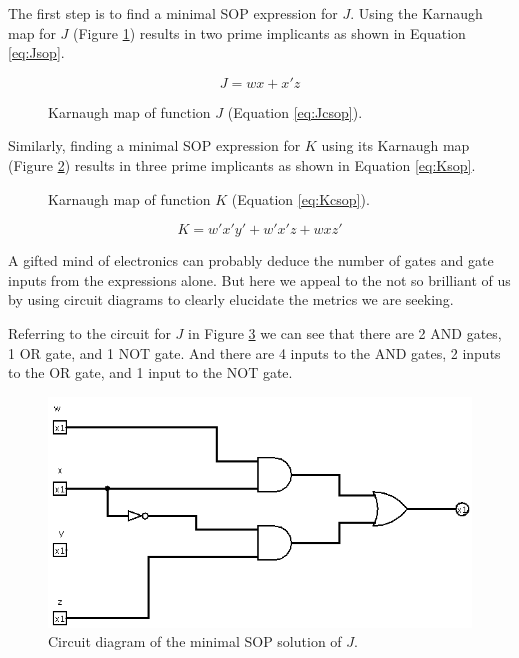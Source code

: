 \documentclass[12pt]{article}
\begin{document}
\begin{samepage}
The first step is to find a minimal SOP expression for $J$.
Using the Karnaugh map for $J$ (Figure \ref{fig:Jmap})
results in two prime implicants as shown in Equation \ref{eq:Jsop}.

\begin{equation}
	J = w x + x' z  \label{eq:Jsop}
\end{equation}
\end{samepage}

\begin{figure}[!hbt]
\begin{center}
\end{center}
\caption{Karnaugh map of function $J$ (Equation \ref{eq:Jcsop}).}
\label{fig:Jmap}
\end{figure}

Similarly, finding a minimal SOP expression for $K$ using its
Karnaugh map (Figure \ref{fig:Kmap}) results in three prime implicants
as shown in Equation \ref{eq:Ksop}.

\begin{figure}[!hbt]
\begin{center}
\end{center}
\caption{Karnaugh map of function $K$ (Equation \ref{eq:Kcsop}).}
\label{fig:Kmap}
\end{figure}

\begin{equation}
	K = w'x'y' + w'x'z + wxz'  \label{eq:Ksop}
\end{equation}

A gifted mind of electronics can probably deduce the number of
gates and gate inputs from the expressions alone.
But here we appeal to the not so brilliant of us by using
circuit diagrams to clearly elucidate the metrics we
are seeking.

Referring to the circuit for $J$ in Figure \ref{fig:Jminsop-01} we
can see that there are 2 AND gates, 1 OR gate, and 1 NOT gate.
And there are 4 inputs to the AND gates, 2 inputs to the OR gate,
and 1 input to the NOT gate.

\begin{figure}[htb]
\center
\includegraphics[scale=0.5]{Jminsop-01}
\caption{Circuit diagram of the minimal SOP solution of $J$.}
\label{fig:Jminsop-01}
\end{figure}
\end{document}
